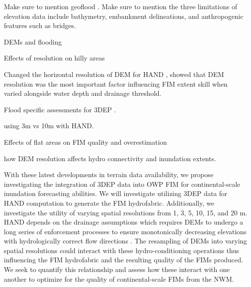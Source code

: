 \documentclass[preprint,review,12pt]{dependencies/elsarticle}
\begin{document}
Make sure to mention geoflood \citep{zheng2018geoflood,zheng2019automatic}.
Make sure to mention the three limitations of elevation data include bathymetry, embankment delineations, and anthropogenic features such as bridges.

DEMs and flooding \citep{casas2006topographic,thomas2016quantifying,savage2016does,passalacqua2010geometric,passalacqua2012automatic,munoth2019effects}

Effects of resolution on hilly areas \citep{dai2019effects}

Changed the horizontal resolution of DEM for HAND \citep{li2022accounting}, showed that DEM resolution was the most important factor influencing FIM extent skill when varied alongside water depth and drainage threshold.

Flood specific assessments for 3DEP \citep{carswell20183d,bales2009sources,gesch2018best,podhoranyi2015inaccuracy,lamichhane2018effect,tsubaki2013uncertainty,dobbs2010evaluation,arrighi2019effects,zazo2015analysis,bhuyian2018accounting,gesch2012elevation}.

\citep{garousi2019terrain} using 3m vs 10m with HAND.

Effects of flat areas on FIM quality and overestimation \citep{garousi2019terrain,godbout2019error,jafarzadegan2017based,papaioannou2017probabilistic}

\citep{lopez2018influence} how DEM resolution affects hydro connectivity and inundation extents.


With these latest developments in terrain data availability, we propose investigating the integration of \ac{3DEP} data into \ac{OWP} \ac{FIM} for continental-scale inundation forecasting abilities.
We will investigate utilizing \ac{3DEP} data for \ac{HAND} computation to generate the \ac{FIM} hydrofabric.
Additionally, we investigate the utility of varying spatial resolutions from 1, 3, 5, 10, 15, and 20 \ac{m}.
\ac{HAND} depends on the drainage assumptions which requires \acp{DEM} to undergo a long series of enforcement processes to ensure monotonically decreasing elevations with hydrologically correct flow directions \citep{garousi2019terrain,nobre2011height,nobre2016hand,aristizabal2022reducing}.
The resampling of \acp{DEM} into varying spatial resolutions could interact with these hydro-conditioning operations thus influencing the \ac{FIM} hydrofabric and the resulting quality of the \acp{FIM} produced.
We seek to quantify this relationship and assess how these interact with one another to optimize for the quality of continental-scale \acp{FIM} from the \ac{NWM}.
\end{document}
